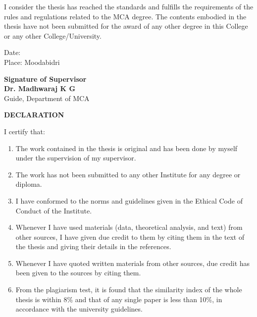 I consider the thesis has reached the standards and fulfills the requirements of the rules and regulations related to the MCA degree. The contents embodied in the thesis have not been submitted for the award of any other degree in this College or any other College/University.

\vspace{4cm}
\begin{flushleft}
    Date: \\
    Place: Moodabidri
\end{flushleft}
\begin{flushright}
    \vspace{-1.5cm}
    \textbf{Signature of Supervisor} \\
    \textbf{Dr. Madhwaraj K G} \\
    Guide, Department of MCA \\
\end{flushright}

\newpage

\begin{center}
    \Large{\textbf{DECLARATION}} \\
    \vspace{1.5cm}
\end{center}
I certify that:
\begin{enumerate}
    \item[a.] The work contained in the thesis is original and has been done by myself under the supervision of my supervisor.
    \item[b.] The work has not been submitted to any other Institute for any degree or diploma.
    \item[c.] I have conformed to the norms and guidelines given in the Ethical Code of Conduct of the Institute.
    \item[d.] Whenever I have used materials (data, theoretical analysis, and text) from other sources, I have given due credit to them by citing them in the text of the thesis and giving their details in the references.
    \item[e.] Whenever I have quoted written materials from other sources, due credit has been given to the sources by citing them.
    \item[f.] From the plagiarism test, it is found that the similarity index of the whole thesis is within 8\% and that of any single paper is less than 10\%, in accordance with the university guidelines.
\end{enumerate}

